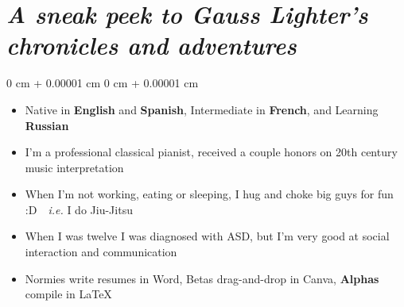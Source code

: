 \documentclass[10pt, letterpaper]{article}
\newenvironment{highlights}{
    \begin{itemize}[
        topsep=0.10 cm,
        parsep=0.1 cm,
        partopsep=0pt,
        itemsep=0pt,
        leftmargin=0 cm + 15pt
    ]
}{
    \end{itemize}
} %
\newenvironment{onecolentry}{
    \begin{adjustwidth}{
        0 cm + 0.00001 cm
    }{
        0 cm + 0.00001 cm
    }
}{
    \end{adjustwidth}
} %
\begin{document}
\vspace{0.2 cm}


\section{\textbf{\textit{A sneak peek to Gauss Lighter’s chronicles and adventures}}}

\vspace{0 cm}

\begin{onecolentry}
    \begin{highlights}
        \item Native in \textbf{English} and \textbf{Spanish}, Intermediate in \textbf{French}, and Learning \textbf{Russian}
        \item I’m a professional classical pianist, received a couple honors on 20th century music interpretation
        \item When I’m not working, eating or sleeping, I hug and choke big guys for fun :D\ \textrightarrow\ \textit{i.e.} I do Jiu-Jitsu
        \item When I was twelve I was diagnosed with ASD, but I’m very good at social interaction and communication
        \item Normies write resumes in Word, Betas drag-and-drop in Canva, \textbf{Alphas} compile in \LaTeX


        
    \end{highlights}
\end{onecolentry}

      
      

    
\end{document}
